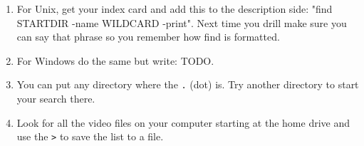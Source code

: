 \begin{enumerate}
\item For Unix, get your  index card and add this to the description side: "find STARTDIR -name WILDCARD -print".  Next time you drill make sure you can say that phrase so you remember how find is formatted.
\item For Windows do the same but write: TODO.
\item You can put any directory where the \verb|.| (dot) is.  Try another directory to start your search there.
\item Look for all the video files on your computer starting at the home drive and use the \verb|>| to save the list to a file.
\end{enumerate}

